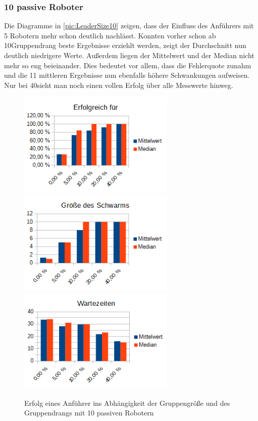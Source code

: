 \subsubsection*{10 passive Roboter}

Die Diagramme in \autoref{pic:LeaderSize10} zeigen, dass der Einfluss des Anführers mit 5 Robotern mehr schon deutlich nachlässt. Konnten vorher schon ab 10\per Gruppendrang beste Ergebnisse erziehlt werden, zeigt der Durchschnitt nun deutlich niedrigere Werte. Außerdem liegen der Mittelwert und der Median nicht mehr so eng beieinander. Dies bedeutet vor allem, dass die Fehlerquote zunahm und die 11 mittleren Ergebnisse nun ebenfalls höhere Schwankungen aufweisen. Nur bei 40\per sieht man noch einen vollen Erfolg über alle Messwerte hinweg.

\begin{figure}[h]
	\includegraphics[width=7.5cm, keepaspectratio]{graphics/Statistics/Leader/FlockSize/10_1.png}
	\includegraphics[width=7.5cm, keepaspectratio]{graphics/Statistics/Leader/FlockSize/10_2.png}
	\includegraphics[width=7.5cm, keepaspectratio]{graphics/Statistics/Leader/FlockSize/10_3.png}
	\caption{Erfolg eines Anführer ins Abhängigkeit der Gruppengröße und des Gruppendrangs mit 10 passiven Robotern}
	\label{pic:LeaderSize10}
\end{figure}

